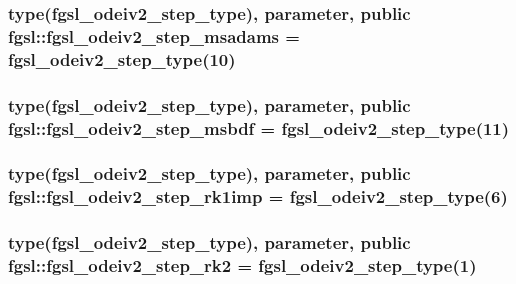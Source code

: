 \hypertarget{classfgsl_a2cdba04e438cd75d8a78612215dcc5bc}{
\subsubsection[{fgsl\-\_\-odeiv2\-\_\-step\-\_\-msadams}]{\setlength{\rightskip}{0pt plus 5cm}type({\bf fgsl\-\_\-odeiv2\-\_\-step\-\_\-type}), parameter, public fgsl\-::fgsl\-\_\-odeiv2\-\_\-step\-\_\-msadams = {\bf fgsl\-\_\-odeiv2\-\_\-step\-\_\-type}(10)}}\label{classfgsl_a2cdba04e438cd75d8a78612215dcc5bc}
\hypertarget{classfgsl_a125bb5f7c78cd4dda6b7a957e8867653}{
\subsubsection[{fgsl\-\_\-odeiv2\-\_\-step\-\_\-msbdf}]{\setlength{\rightskip}{0pt plus 5cm}type({\bf fgsl\-\_\-odeiv2\-\_\-step\-\_\-type}), parameter, public fgsl\-::fgsl\-\_\-odeiv2\-\_\-step\-\_\-msbdf = {\bf fgsl\-\_\-odeiv2\-\_\-step\-\_\-type}(11)}}\label{classfgsl_a125bb5f7c78cd4dda6b7a957e8867653}
\hypertarget{classfgsl_ae903b3c5e98a84868123fcf7f45cdf11}{
\subsubsection[{fgsl\-\_\-odeiv2\-\_\-step\-\_\-rk1imp}]{\setlength{\rightskip}{0pt plus 5cm}type({\bf fgsl\-\_\-odeiv2\-\_\-step\-\_\-type}), parameter, public fgsl\-::fgsl\-\_\-odeiv2\-\_\-step\-\_\-rk1imp = {\bf fgsl\-\_\-odeiv2\-\_\-step\-\_\-type}(6)}}\label{classfgsl_ae903b3c5e98a84868123fcf7f45cdf11}
\hypertarget{classfgsl_a3f76db1b3a7cdaa6b00e64515d6641b0}{
\subsubsection[{fgsl\-\_\-odeiv2\-\_\-step\-\_\-rk2}]{\setlength{\rightskip}{0pt plus 5cm}type({\bf fgsl\-\_\-odeiv2\-\_\-step\-\_\-type}), parameter, public fgsl\-::fgsl\-\_\-odeiv2\-\_\-step\-\_\-rk2 = {\bf fgsl\-\_\-odeiv2\-\_\-step\-\_\-type}(1)}}\label{classfgsl_a3f76db1b3a7cdaa6b00e64515d6641b0}
